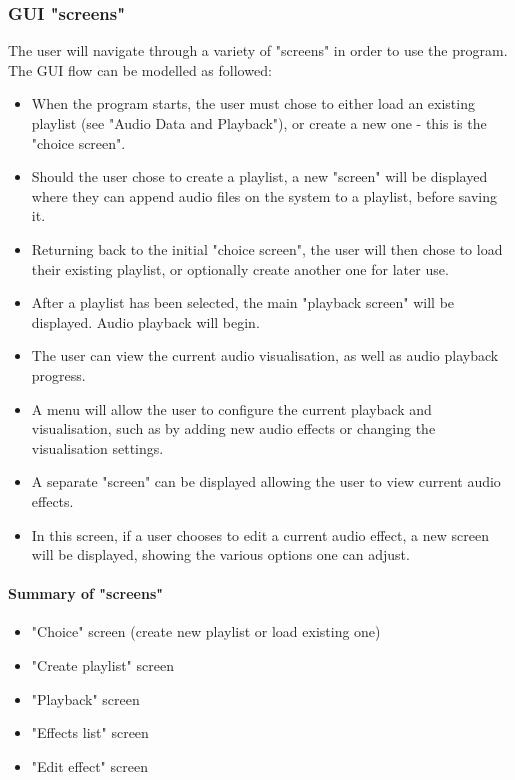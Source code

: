 \subsubsection{GUI "screens"}
The user will navigate through a variety of "screens" in order to use the program. The GUI flow can be modelled as followed:
\begin{itemize}
	\item When the program starts, the user must chose to either load an existing playlist (see "Audio Data and Playback"), or create a new one - this is the "choice screen".
	\item Should the user chose to create a playlist, a new "screen" will be displayed where they can append audio files on the system to a playlist, before saving it.
	\item Returning back to the initial "choice screen", the user will then chose to load their existing playlist, or optionally create another one for later use.
	\item After a playlist has been selected, the main "playback screen" will be displayed. Audio playback will begin.
	\item The user can view the current audio visualisation, as well as audio playback progress.
	\item A menu will allow the user to configure the current playback and visualisation, such as by adding new audio effects or changing the visualisation settings.
	\item A separate "screen" can be displayed allowing the user to view current audio effects.
	\item In this screen, if a user chooses to edit a current audio effect, a new screen will be displayed, showing the various options one can adjust.
\end{itemize}

\paragraph{Summary of "screens"}
\begin{itemize}
	\item "Choice" screen (create new playlist or load existing one)
	\item "Create playlist" screen
	\item "Playback" screen
	\item "Effects list" screen
	\item "Edit effect" screen
\end{itemize}

